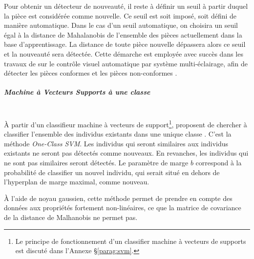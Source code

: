 Pour obtenir un détecteur de nouveauté, il reste à définir un seuil à partir duquel la pièce est considérée comme nouvelle.
Ce seuil est soit imposé, soit défini de manière automatique.
Dans le cas d'un seuil automatique, on choisira un seuil égal à la distance de Mahalanobis de l'ensemble des pièces actuellement dans la base d'apprentissage. %
La distance de toute pièce nouvelle dépassera alors ce seuil et la nouveauté sera détectée.
Cette démarche est employée avec succès dans les travaux de \citeauthor{lacombe_exploitation_2018a} sur le contrôle visuel automatique par système multi-éclairage, afin de détecter les pièces conformes et les pièces non-conformes \cite{lacombe_exploitation_2018a}.

\subparagraph{Machine à Vecteurs Supports à une classe}\mbox{} \\
À partir d'un classifieur machine à vecteurs de support\footnote{Le principe de fonctionnement d'un classifier machine à vecteurs de supports est discuté dans l'Annexe §\ref{parag:svm}.}, \citeauthor{scholkopf_support_1999} proposent de chercher à classifier l'ensemble des individus existants dans une unique classe \cite{scholkopf_support_1999, scholkopf_estimating_2001}.
C'est la méthode \textit{One-Class SVM}.
Les individus qui seront similaires aux individus existants ne seront pas détectés comme nouveaux.
En revanches, les individus qui ne sont pas similaires seront détectés.
Le paramètre de marge $b$ correspond à la probabilité de classifier un nouvel individu, qui serait situé en dehors de l'hyperplan de marge maximal, comme nouveau.

À l'aide de noyau gaussien, cette méthode permet de prendre en compte des données aux propriétés fortement non-linéaires, ce que la matrice de covariance de la distance de Malhanobis ne permet pas.


%

